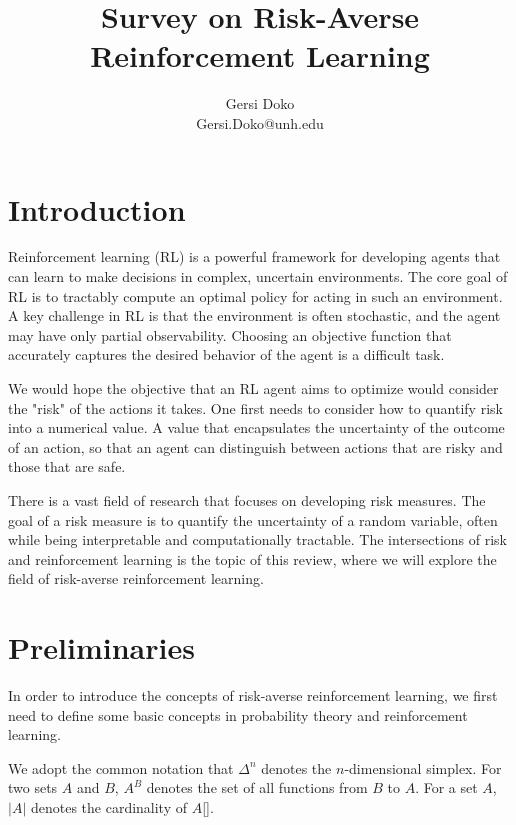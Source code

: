 \documentclass[10pt]{article}
\title{Survey on Risk-Averse Reinforcement Learning}
\author{Gersi Doko \\
        Gersi.Doko@unh.edu \\}
\theoremstyle{plain}
\theoremstyle{remark}
\begin{document}
\maketitle

\section{Introduction}

Reinforcement learning (RL) is a powerful framework for developing agents that can learn to make decisions in complex, uncertain environments.
The core goal of RL is to tractably compute an optimal policy for acting in such an environment. A key challenge in RL is 
that the environment is often stochastic, and the agent may have only partial observability. 
Choosing an objective function that accurately captures the desired behavior of the agent is a difficult task.

We would hope the objective that an RL agent aims to optimize would consider the "risk" of the actions it takes.
One first needs to consider how to quantify risk into a numerical value. A value that encapsulates the uncertainty of the outcome of an action,
so that an agent can distinguish between actions that are risky and those that are safe.

There is a vast field of research that focuses on developing risk measures.
The goal of a risk measure is to quantify the uncertainty of a random variable, often while being interpretable and computationally tractable.
The intersections of risk and reinforcement learning is the topic of this review, where we will explore the field of risk-averse reinforcement learning.

\section{Preliminaries}

In order to introduce the concepts of risk-averse reinforcement learning, we first need to define some basic concepts in probability theory and reinforcement learning.

We adopt the common notation that $\Delta^n$ denotes the $n$-dimensional simplex. For two sets $A$ and $B$, $A^B$ denotes the set of all functions from $B$ to $A$.
For a set $A$, $|A|$ denotes the cardinality of $A$[].
\end{document}
